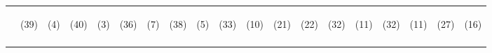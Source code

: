 \begin{tabular}{lcccccccccccccccccc}
 & \begin{footnotesize}(39)\end{footnotesize} & \begin{footnotesize}(4)\end{footnotesize} & \begin{footnotesize}(40)\end{footnotesize} & \begin{footnotesize}(3)\end{footnotesize} & \begin{footnotesize}(36)\end{footnotesize} & \begin{footnotesize}(7)\end{footnotesize} & \begin{footnotesize}(38)\end{footnotesize} & \begin{footnotesize}(5)\end{footnotesize} & \begin{footnotesize}(33)\end{footnotesize} & \begin{footnotesize}(10)\end{footnotesize} & \begin{footnotesize}(21)\end{footnotesize} & \begin{footnotesize}(22)\end{footnotesize} & \begin{footnotesize}(32)\end{footnotesize} & \begin{footnotesize}(11)\end{footnotesize} & \begin{footnotesize}(32)\end{footnotesize} & \begin{footnotesize}(11)\end{footnotesize} & \begin{footnotesize}(27)\end{footnotesize} & \begin{footnotesize}(16)\end{footnotesize}\\
\noalign{\smallskip}\hline\end{tabular}\\

